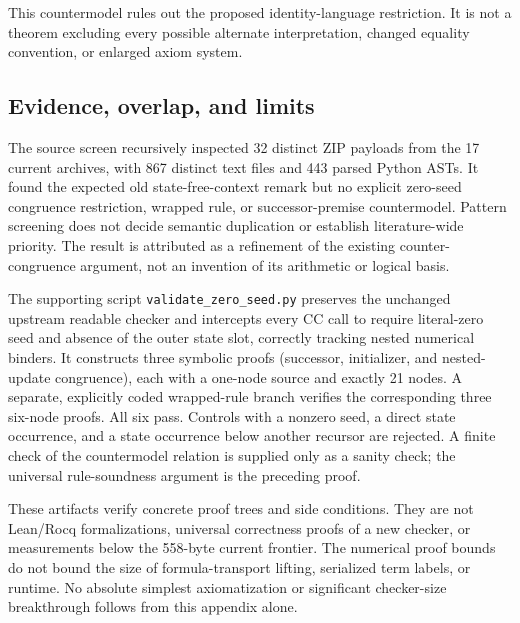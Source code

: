 \documentclass[11pt,letterpaper]{article}
\theoremstyle{definition}\newtheorem{definition}[theorem]{Definition}
\theoremstyle{remark}\newtheorem{remark}[theorem]{Remark}
\begin{document}
This countermodel rules out the proposed identity-language restriction.
It is not a theorem excluding every possible alternate interpretation,
changed equality convention, or enlarged axiom system.

\subsection{Evidence, overlap, and limits}

The source screen recursively inspected 32 distinct ZIP payloads from the
17 current archives, with 867 distinct text files and 443 parsed Python
ASTs. It found the expected old state-free-context remark but no explicit
zero-seed congruence restriction, wrapped rule, or successor-premise
countermodel. Pattern screening does not decide semantic duplication or
establish literature-wide priority. The result is attributed as a
refinement of the existing counter-congruence argument, not an invention
of its arithmetic or logical basis.

The supporting script \texttt{validate\_zero\_seed.py} preserves the
unchanged upstream readable checker and intercepts every CC call to
require literal-zero seed and absence of the outer state slot, correctly
tracking nested numerical binders. It constructs three symbolic proofs
(successor, initializer, and nested-update congruence), each with a one-node
source and exactly 21 nodes. A separate, explicitly coded wrapped-rule
branch verifies the corresponding three six-node proofs. All six pass.
Controls with a nonzero seed, a direct state occurrence, and a state
occurrence below another recursor are rejected. A finite check of the
countermodel relation is supplied only as a sanity check; the universal
rule-soundness argument is the preceding proof.

These artifacts verify concrete proof trees and side conditions. They are
not Lean/Rocq formalizations, universal correctness proofs of a new checker,
or measurements below the 558-byte current frontier. The numerical proof
bounds do not bound the size of formula-transport lifting, serialized term
labels, or runtime. No absolute simplest axiomatization or significant
checker-size breakthrough follows from this appendix alone.
\end{document}

